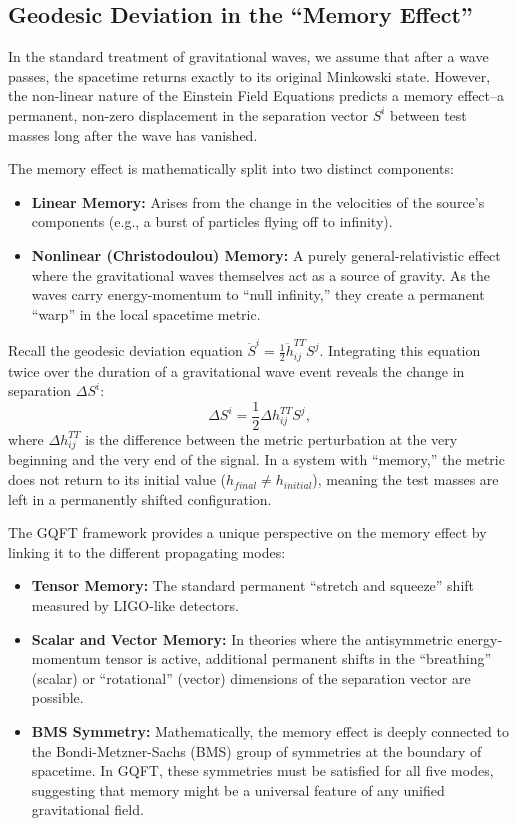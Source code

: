 \subsection{Geodesic Deviation in the ``Memory Effect''} In the standard treatment of gravitational waves, we assume that after a wave passes, the spacetime returns exactly to its original Minkowski state. However, the non-linear nature of the Einstein Field Equations predicts a memory effect--a permanent, non-zero displacement in the separation vector $S^i$ between test masses long after the wave has vanished.

The memory effect is mathematically split into two distinct components:
\begin{itemize}
  \item \textbf{Linear Memory:} Arises from the change in the velocities of the source's components (e.g., a burst of particles flying off to infinity).
  \item \textbf{Nonlinear (Christodoulou) Memory:} A purely general-relativistic effect where the gravitational waves themselves act as a source of gravity. As the waves carry energy-momentum to ``null infinity,'' they create a permanent ``warp'' in the local spacetime metric.
\end{itemize}

Recall the geodesic deviation equation $\ddot{S}^i = \frac{1}{2} \ddot{h}^{TT}_{ij} S^j$. Integrating this equation twice over the duration of a gravitational wave event reveals the change in separation $\Delta S^i$:
\[%
  \Delta S^i = \frac{1}{2} \Delta h^{TT}_{ij} S^j
,\]%
where $\Delta h^{TT}_{ij}$ is the difference between the metric perturbation at the very beginning and the very end of the signal. In a system with ``memory,'' the metric does not return to its initial value ($h_{final} \neq h_{initial}$), meaning the test masses are left in a permanently shifted configuration.

The GQFT framework provides a unique perspective on the memory effect by linking it to the different propagating modes:
\begin{itemize}
  \item \textbf{Tensor Memory:} The standard permanent ``stretch and squeeze'' shift measured by LIGO-like detectors.
  \item \textbf{Scalar and Vector Memory:} In theories where the antisymmetric energy-momentum tensor is active, additional permanent shifts in the ``breathing'' (scalar) or ``rotational'' (vector) dimensions of the separation vector are possible.
  \item \textbf{BMS Symmetry:} Mathematically, the memory effect is deeply connected to the Bondi-Metzner-Sachs (BMS) group of symmetries at the boundary of spacetime. In GQFT, these symmetries must be satisfied for all five modes, suggesting that memory might be a universal feature of any unified gravitational field.
\end{itemize}


